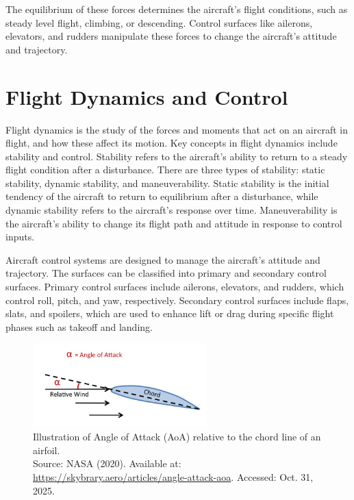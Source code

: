 The equilibrium of these forces determines the aircraft's flight conditions, such as steady level flight, climbing, or descending. Control surfaces like ailerons, elevators, and rudders manipulate these forces to change the aircraft's attitude and trajectory.

\section{Flight Dynamics and Control}


Flight dynamics is the study of the forces and moments that act on an aircraft in flight, and how these affect its motion. Key concepts in flight dynamics include stability and control. Stability refers to the aircraft's ability to return to a steady flight condition after a disturbance. There are three types of stability: static stability, dynamic stability, and maneuverability. Static stability is the initial tendency of the aircraft to return to equilibrium after a disturbance, while dynamic stability refers to the aircraft's response over time. Maneuverability is the aircraft's ability to change its flight path and attitude in response to control inputs.

Aircraft control systems are designed to manage the aircraft's attitude and trajectory. The surfaces can be classified into primary and secondary control surfaces. Primary control surfaces include ailerons, elevators, and rudders, which control roll, pitch, and yaw, respectively. Secondary control surfaces include flaps, slats, and spoilers, which are used to enhance lift or drag during specific flight phases such as takeoff and landing.

\begin{figure}[H]
    \centering
    \includegraphics[width=0.6\textwidth]{figures/angle_of_attack.jpg}
    \caption{Illustration of Angle of Attack (AoA) relative to the chord line of an airfoil. \\ Source: NASA (2020). Available at: \url{https://skybrary.aero/articles/angle-attack-aoa}. Accessed: Oct. 31, 2025.}
    \label{fig:angle_of_attack}
\end{figure}


